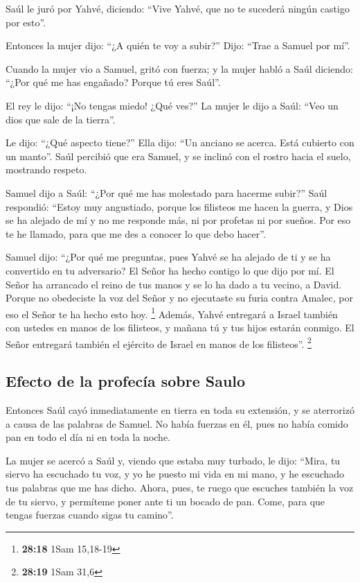 \begin{paracol}{2}
 Saúl le juró por Yahvé, diciendo: ``Vive Yahvé, que no
te sucederá ningún castigo por esto''.

 Entonces la mujer dijo: ``¿A quién te voy a subir?''
Dijo: ``Trae a Samuel por mí''.

 Cuando la mujer vio a Samuel, gritó con fuerza; y la
mujer habló a Saúl diciendo: ``¿Por qué me has engañado? Porque tú eres
Saúl''.

 El rey le dijo: ``¡No tengas miedo! ¿Qué ves?'' La mujer
le dijo a Saúl: ``Veo un dios que sale de la tierra''.

 Le dijo: ``¿Qué aspecto tiene?'' Ella dijo: ``Un anciano
se acerca. Está cubierto con un manto''. Saúl percibió que era Samuel, y
se inclinó con el rostro hacia el suelo, mostrando respeto.

 Samuel dijo a Saúl: ``¿Por qué me has molestado para
hacerme subir?'' Saúl respondió: ``Estoy muy angustiado, porque los
filisteos me hacen la guerra, y Dios se ha alejado de mí y no me
responde más, ni por profetas ni por sueños. Por eso te he llamado, para
que me des a conocer lo que debo hacer''.

 Samuel dijo: ``¿Por qué me preguntas, pues Yahvé se ha
alejado de ti y se ha convertido en tu adversario?  El
Señor ha hecho contigo lo que dijo por mí. El Señor ha arrancado el
reino de tus manos y se lo ha dado a tu vecino, a David. 
Porque no obedeciste la voz del Señor y no ejecutaste su furia contra
Amalec, por eso el Señor te ha hecho esto hoy. \footnote{\textbf{28:18}
  1Sam 15,18-19}  Además, Yahvé entregará a Israel
también con ustedes en manos de los filisteos, y mañana tú y tus hijos
estarán conmigo. El Señor entregará también el ejército de Israel en
manos de los filisteos''. \footnote{\textbf{28:19} 1Sam 31,6}

\hypertarget{efecto-de-la-profecuxeda-sobre-saulo}{%
\subsection{Efecto de la profecía sobre
Saulo}\label{efecto-de-la-profecuxeda-sobre-saulo}}

 Entonces Saúl cayó inmediatamente en tierra en toda su
extensión, y se aterrorizó a causa de las palabras de Samuel. No había
fuerzas en él, pues no había comido pan en todo el día ni en toda la
noche.

 La mujer se acercó a Saúl y, viendo que estaba muy
turbado, le dijo: ``Mira, tu siervo ha escuchado tu voz, y yo he puesto
mi vida en mi mano, y he escuchado tus palabras que me has dicho.
 Ahora, pues, te ruego que escuches también la voz de tu
siervo, y permíteme poner ante ti un bocado de pan. Come, para que
tengas fuerzas cuando sigas tu camino''.


\end{paracol}
